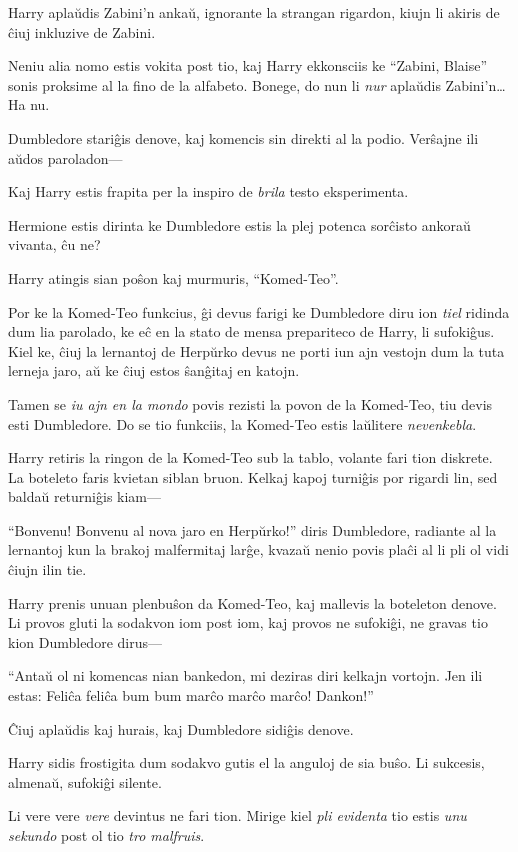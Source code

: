 Harry aplaŭdis Zabini'n ankaŭ, ignorante la strangan rigardon, kiujn li
akiris de ĉiuj inkluzive de Zabini.

Neniu alia nomo estis vokita post tio, kaj Harry ekkonsciis ke
``Zabini, Blaise'' sonis proksime al la fino de la alfabeto. Bonege,
do nun li \emph{nur} aplaŭdis Zabini'n\ldots Ha nu.

Dumbledore stariĝis denove, kaj komencis sin direkti al la
podio. Verŝajne ili aŭdos paroladon—

Kaj Harry estis frapita per la inspiro de \emph{brila} testo
eksperimenta.

Hermione estis dirinta ke Dumbledore estis la plej potenca sorĉisto
ankoraŭ vivanta, ĉu ne?

Harry atingis sian poŝon kaj murmuris, ``Komed-Teo''.

Por ke la Komed-Teo funkcius, ĝi devus farigi ke Dumbledore diru ion
\emph{tiel} ridinda dum lia parolado, ke eĉ en la stato de mensa
prepariteco de Harry, li sufokiĝus. Kiel ke, ĉiuj la
lernantoj de Herpŭrko devus ne porti iun ajn vestojn dum la tuta
lerneja jaro, aŭ ke ĉiuj estos ŝanĝitaj en katojn.

Tamen se \emph{iu ajn en la mondo} povis rezisti la povon de la
Komed-Teo, tiu devis esti Dumbledore. Do se tio funkciis, la Komed-Teo
estis laŭlitere \emph{nevenkebla}.

Harry retiris la ringon de la Komed-Teo sub la tablo, volante fari
tion diskrete. La boteleto faris kvietan siblan bruon. Kelkaj kapoj
turniĝis por rigardi lin, sed baldaŭ returniĝis kiam—

``Bonvenu! Bonvenu al nova jaro en Herpŭrko!'' diris Dumbledore,
radiante al la lernantoj kun la brakoj malfermitaj larĝe, kvazaŭ
nenio povis plaĉi al li pli ol vidi ĉiujn ilin tie.

Harry prenis unuan plenbuŝon da Komed-Teo, kaj mallevis la boteleton
denove. Li provos gluti la sodakvon iom post iom, kaj provos ne
sufokiĝi, ne gravas tio kion Dumbledore dirus—

``Antaŭ ol ni komencas nian bankedon, mi deziras diri kelkajn
vortojn. Jen ili estas: Feliĉa feliĉa bum bum marĉo marĉo marĉo!
Dankon!''

Ĉiuj aplaŭdis kaj hurais, kaj Dumbledore sidiĝis denove.

Harry sidis frostigita dum sodakvo gutis el la anguloj de sia buŝo. Li
sukcesis, almenaŭ, sufokiĝi silente.

Li vere vere \emph{vere} devintus ne fari tion. Mirige kiel \emph{pli
  evidenta} tio estis \emph{unu sekundo} post ol tio \emph{tro
  malfruis}.

